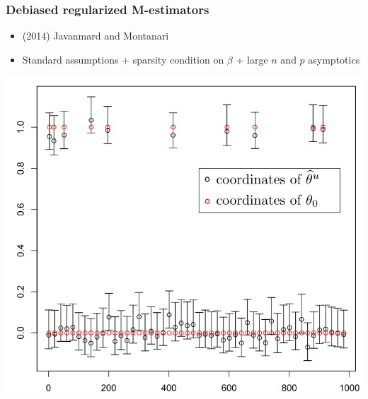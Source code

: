 \documentclass{beamer}
\begin{document}
\begin{frame}
\frametitle{Debiased regularized M-estimators}
\begin{itemize}
\item (2014) Javanmard and Montanari
\item Standard assumptions + sparsity condition on $\beta$ + large $n$ and $p$ asymptotics
\end{itemize}
\begin{center}
\includegraphics[scale = 0.25]{javanmard.png}
\end{center}
\end{frame}
\end{document}
